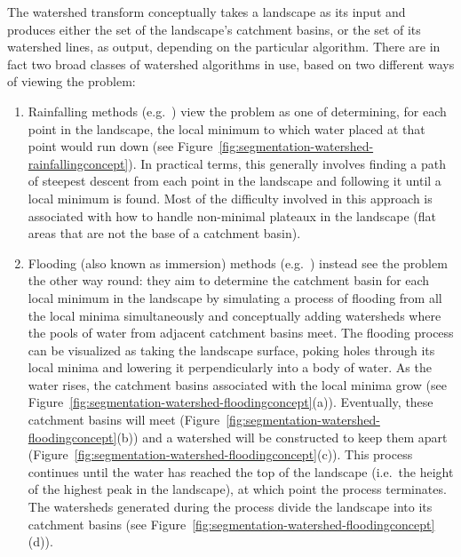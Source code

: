 
The watershed transform conceptually takes a landscape as its input and produces either the set of the landscape's catchment basins, or the set of its watershed lines, as output, depending on the particular algorithm. There are in fact two broad classes of watershed algorithms in use, based on two different ways of viewing the problem:
%
\begin{enumerate}

\item Rainfalling methods (e.g.~\cite{meijster98,osma-ruiz06,stoev00}) view the problem as one of determining, for each point in the landscape, the local minimum to which water placed at that point would run down (see Figure~\ref{fig:segmentation-watershed-rainfallingconcept}). In practical terms, this generally involves finding a path of steepest descent from each point in the landscape and following it until a local minimum is found. Most of the difficulty involved in this approach is associated with how to handle non-minimal plateaux in the landscape (flat areas that are not the base of a catchment basin).

\item Flooding (also known as immersion) methods (e.g.~\cite{bieniek00,rambabu07}) instead see the problem the other way round: they aim to determine the catchment basin for each local minimum in the landscape by simulating a process of flooding from all the local minima simultaneously and conceptually adding watersheds where the pools of water from adjacent catchment basins meet. The flooding process can be visualized as taking the landscape surface, poking holes through its local minima and lowering it perpendicularly into a body of water. As the water rises, the catchment basins associated with the local minima grow (see Figure~\ref{fig:segmentation-watershed-floodingconcept}(a)). Eventually, these catchment basins will meet (Figure~\ref{fig:segmentation-watershed-floodingconcept}(b)) and a watershed will be constructed to keep them apart (Figure~\ref{fig:segmentation-watershed-floodingconcept}(c)). This process continues until the water has reached the top of the landscape (i.e.~the height of the highest peak in the landscape), at which point the process terminates. The watersheds generated during the process divide the landscape into its catchment basins (see Figure~\ref{fig:segmentation-watershed-floodingconcept}(d)).

\end{enumerate}

